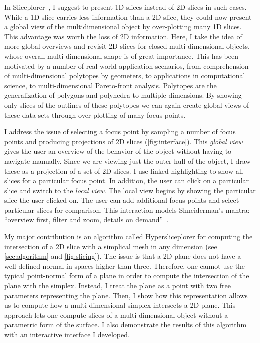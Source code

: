 In Sliceplorer~\cite{Torsney-Weir:2017a}, I suggest to
present 1D slices instead of 2D slices in such cases. While a 1D slice carries
less information than a 2D slice, they could now present a global view of the
multidimensional object by over-plotting many 1D slices. This advantage was
worth the loss of 2D information. Here, I take the idea of more global overviews and revisit 2D 
slices for closed multi-dimensional objects, whose overall multi-dimensional shape is
of great importance. This has been motivated by a number of real-world
application scenarios, from comprehension of multi-dimensional polytopes by 
geometers, to applications in computational science, to
multi-dimensional Pareto-front analysis. Polytopes are the generalization of polygons and polyhedra to multiple dimensions. By showing only slices of the outlines of these
polytopes we can again create global views of these data sets through
over-plotting of many focus points.


I address the issue of selecting a focus point by sampling a number of focus
points and producing projections of 2D slices (\autoref{fig:interface}). This
\emph{global view} gives the user an overview of the behavior of the object
without having to navigate manually. Since we are viewing just
the outer hull of the object, I draw these as a projection of a set of 2D
slices. I use linked highlighting to show all slices for a particular focus
point. In addition, the user can click on a particular slice and switch to the
\emph{local view}. The local view begins by showing the particular slice the
user clicked on. The user can add additional focus points and select particular
slices for comparison. This interaction models Shneiderman's mantra: ``overview
first, filter and zoom, details on demand''~\cite{Shneiderman:1996}.

My major contribution is an algorithm called Hypersliceplorer for computing the
intersection of a 2D slice with a simplical mesh in any dimension (see
\autoref{sec:algorithm} and \autoref{fig:slicing}). The issue is that a 2D
plane does not have a well-defined normal in spaces higher than three.
Therefore, one cannot use the typical point-normal form of a plane in order to
compute the intersection of the plane with the simplex. Instead, I treat the
plane as a point with two free parameters representing the plane. Then, I show
how this representation allows us to compute how a multi-dimensional simplex
intersects a 2D plane. This approach lets one compute slices of a
multi-dimensional object without a parametric form of the surface. I also
demonstrate the results of this algorithm with an interactive interface I
developed.

